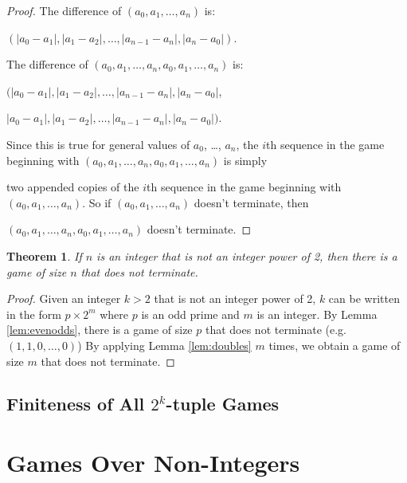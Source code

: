 \documentclass[12pt]{amsart}
\newtheorem{theorem}{Theorem}[section]
\begin{document}
\begin{proof}

The difference of $(a_0, a_1, \ldots, a_{n})$ is:

\noindent
 $(|a_0 - a_1|, |a_1 - a_2|, \ldots, |a_{n-1} - a_n|, |a_n - a_0|)$.

\vspace{.2cm}

The difference of $(a_0, a_1, \ldots, a_{n}, a_0, a_1, \ldots, a_n)$ is:

\noindent
$(|a_0 - a_1|, |a_1 - a_2|, \ldots, |a_{n-1} - a_n|, |a_n - a_0|$,

\noindent
$|a_0 - a_1|, |a_1 - a_2|, \ldots, |a_{n-1} - a_n|, |a_n - a_0|)$.

Since this is true for general values of $a_0$, \ldots, $a_n$, the $i$th sequence in the game beginning with $(a_0, a_1, \ldots, a_{n}, a_0, a_1, \ldots, a_n)$ is simply

\noindent
two appended copies of the $i$th sequence in the game beginning with $(a_0, a_1, \ldots, a_{n})$. So if $(a_0, a_1, \ldots, a_{n})$ doesn't terminate, then 

\noindent
$(a_0, a_1, \ldots, a_{n}, a_0, a_1, \ldots, a_{n})$ doesn't terminate.

\end{proof}

\begin{theorem}
\label{theorem:notPowersOfTwo}
If $n$ is an integer that is not an integer power of 2, then there is a game of size $n$ that does not terminate.
\end{theorem}

\begin{proof}

Given an integer $k > 2$ that is not an integer power of 2, $k$ can be written in the form $p \times 2^{m}$ where $p$ is an odd prime and $m$ is an integer. By Lemma \ref{lem:evenodds}, there is a game of size $p$ that does not terminate (e.g. $(1,1,0, \ldots, 0)$) By applying Lemma \ref{lem:doubles} $m$ times, we obtain a game of size $m$ that does not terminate. 
\end{proof}

\subsection{Finiteness of All $2^k$-tuple Games}



\section{Games Over Non-Integers}
\end{document}
